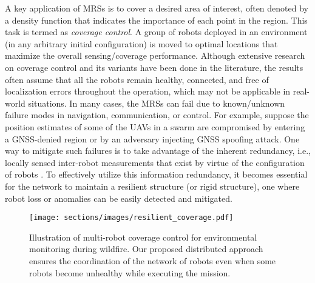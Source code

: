 A key application of MRSs is to cover a desired area of interest, often denoted by a density function that indicates the importance of each point in the region. This task is termed as \textit{coverage control}. A group of robots deployed in an environment (in any arbitrary initial configuration) is moved to optimal locations that maximize the overall sensing/coverage performance.
Although extensive research on coverage control and its variants \cite{pierson2017adapting, schwager2009decentralized, todescato2017multi, lee2015multirobot, carron2020model, luo2019voronoi} have been done in the literature, the results often assume that all the robots remain healthy, connected, and free of localization errors throughout the operation, which may not be applicable in real-world situations. In many cases, the MRSs can fail due to known/unknown failure modes in navigation, communication, or control. For example, suppose the position estimates of some of the UAVs in a swarm are compromised by entering a GNSS-denied region or by an adversary injecting GNSS spoofing attack. One way to mitigate such failures is to take advantage of the inherent redundancy, i.e., locally sensed inter-robot measurements that exist by virtue of the configuration of robots \cite{vijay2025range}. To effectively utilize this information redundancy, it becomes essential for the network to maintain a resilient structure (or rigid structure), one where robot loss or anomalies can be easily detected and mitigated. 

\begin{figure}[t]
\centering
\texttt{[image: sections/images/resilient\_coverage.pdf]}
\caption{Illustration of multi-robot coverage control for environmental monitoring during wildfire. Our proposed distributed approach ensures the coordination of the network of robots even when some robots become unhealthy while executing the mission. }
\label{fig:illustration}
\end{figure} 

